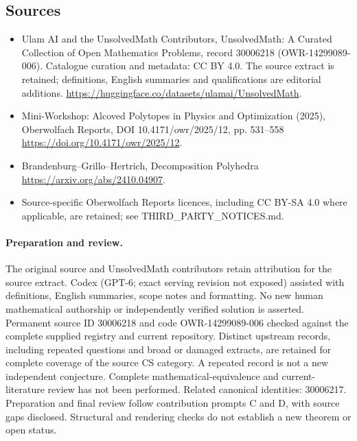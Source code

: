 \documentclass[11pt]{article}
\begin{document}
\subsection{Sources}
\begin{itemize}
\item[\hypertarget{source:30006218:1}{S1}] Ulam AI and the UnsolvedMath Contributors, UnsolvedMath: A Curated Collection of Open Mathematics Problems, record 30006218 (OWR-14299089-006). Catalogue curation and metadata: CC BY 4.0. The source extract is retained; definitions, English summaries and qualifications are editorial additions.
\url{https://huggingface.co/datasets/ulamai/UnsolvedMath}.
\item[\hypertarget{source:30006218:2}{S2}] Mini-Workshop: Alcoved Polytopes in Physics and Optimization (2025), Oberwolfach Reports, DOI 10.4171/owr/2025/12, pp. 531--558
\url{https://doi.org/10.4171/owr/2025/12}.
\item[\hypertarget{source:30006218:3}{S3}] Brandenburg--Grillo--Hertrich, Decomposition Polyhedra
\url{https://arxiv.org/abs/2410.04907}.
\item Source-specific Oberwolfach Reports licences, including CC BY-SA 4.0 where applicable, are retained; see THIRD\_PARTY\_NOTICES.md.
\end{itemize}
\paragraph{Preparation and review.}
The original source and UnsolvedMath contributors retain attribution for the source extract. Codex (GPT-6; exact serving revision not exposed) assisted with definitions, English summaries, scope notes and formatting. No new human mathematical authorship or independently verified solution is asserted. Permanent source ID 30006218 and code OWR-14299089-006 checked against the complete supplied registry and current repository. Distinct upstream records, including repeated questions and broad or damaged extracts, are retained for complete coverage of the source CS category. A repeated record is not a new independent conjecture. Complete mathematical-equivalence and current-literature review has not been performed. Related canonical identities: 30006217. Preparation and final review follow contribution prompts C and D, with source gaps disclosed. Structural and rendering checks do not establish a new theorem or open status.
\label{end:30006218}
\end{document}
